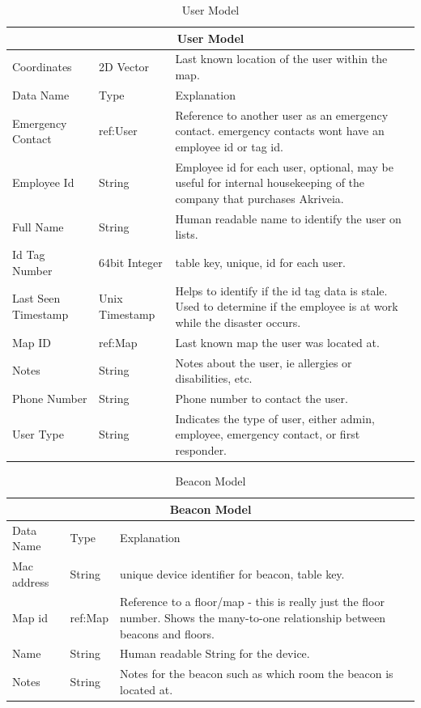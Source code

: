\begin{table}[H]
\centering
\begin{tabular}{| m{3cm} | m{3cm} | m{9.5cm} |}
	\hline
	\multicolumn{3}{|c|}{User Model} \\
	\hline
	Coordinates & 2D Vector & Last known location of the user within the map. \\
	\hline
	Data Name & Type & Explanation \\
	\hline
	Emergency Contact & ref:User & Reference to another user as an emergency contact. emergency contacts wont have an employee id or tag id. \\
	\hline
	Employee Id & String & Employee id for each user, optional, may be useful for internal housekeeping of the company that purchases Akriveia. \\
	\hline
	Full Name & String & Human readable name to identify the user on lists. \\
	\hline
	Id Tag Number & 64bit Integer & table key, unique, id for each user. \\
	\hline
	Last Seen Timestamp & Unix Timestamp & Helps to identify if the id tag data is stale. Used to determine if the employee is at work while the disaster occurs. \\
	\hline
	Map ID & ref:Map & Last known map the user was located at. \\
	\hline
	Notes & String & Notes about the user, ie allergies or disabilities, etc. \\
	\hline
	Phone Number & String & Phone number to contact the user. \\
	\hline
	User Type & String & Indicates the type of user, either admin, employee, emergency contact, or first responder. \\
	\hline
\end{tabular}
\caption{User Model}
\label{user_model}
\end{table}

\begin{table}[H]
\centering
\begin{tabular}{ | m{3cm} | m{3cm} | m{9.5cm} |}
	\hline
	\multicolumn{3}{|c|}{Beacon Model} \\
	\hline
	Data Name & Type & Explanation \\
	\hline
	Mac address & String & unique device identifier for beacon, table key.\\
	\hline
	Map id & ref:Map & Reference to a floor/map - this is really just the floor number. Shows the many-to-one relationship between beacons and floors. \\
	\hline
	Name & String & Human readable String for the device. \\
	\hline
	Notes & String & Notes for the beacon such as which room the beacon is located at. \\
	\hline
\end{tabular}
\caption{Beacon Model}
\label{beacon_model}
\end{table}

